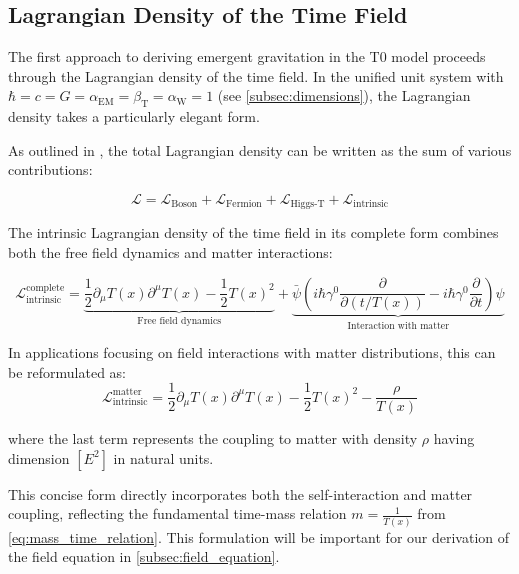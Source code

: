 \documentclass[12pt,a4paper]{article}
\newcommand{\Tfield}{T(x)}
\newcommand{\betaT}{\beta_{\text{T}}}
\newcommand{\alphaEM}{\alpha_{\text{EM}}}
\newcommand{\alphaW}{\alpha_{\text{W}}}
\begin{document}
	\subsection{Lagrangian Density of the Time Field}
	\label{subsec:lagrangian_density}
	The first approach to deriving emergent gravitation in the T0 model proceeds through the Lagrangian density of the time field. In the unified unit system with \(\hbar = c = G = \alphaEM = \betaT = \alphaW = 1\) (see \cref{subsec:dimensions}), the Lagrangian density takes a particularly elegant form.
	
	As outlined in \cite{pascher_lagrange_2025,pascher_messdifferenzen_2025}, the total Lagrangian density can be written as the sum of various contributions:
	
	\begin{equation}
		\label{eq:total_lagrangian}
		\mathcal{L} = \mathcal{L}_{\text{Boson}} + \mathcal{L}_{\text{Fermion}} + \mathcal{L}_{\text{Higgs-T}} + \mathcal{L}_{\text{intrinsic}}
	\end{equation}
	
	The intrinsic Lagrangian density of the time field in its complete form combines both the free field dynamics and matter interactions:
	
	\begin{equation}
		\label{eq:intrinsic_lagrangian_complete}
		\mathcal{L}_{\text{intrinsic}}^{\text{complete}} = \underbrace{\frac{1}{2} \partial_\mu \Tfield \partial^\mu \Tfield - \frac{1}{2}\Tfield^2}_{\text{Free field dynamics}} + \underbrace{\bar{\psi} \left( i\hbar \gamma^0 \frac{\partial}{\partial (t/\Tfield)} - i\hbar \gamma^0 \frac{\partial}{\partial t} \right) \psi}_{\text{Interaction with matter}}
	\end{equation}
	
	In applications focusing on field interactions with matter distributions, this can be reformulated as:
	\begin{equation}
		\label{eq:intrinsic_lagrangian_matter}
		\mathcal{L}_{\text{intrinsic}}^{\text{matter}} = \frac{1}{2} \partial_\mu \Tfield \partial^\mu \Tfield - \frac{1}{2}\Tfield^2 - \frac{\rho}{\Tfield}
	\end{equation}
	
	where the last term represents the coupling to matter with density $\rho$ having dimension $[E^2]$ in natural units.
	
	This concise form directly incorporates both the self-interaction and matter coupling, reflecting the fundamental time-mass relation \(m = \frac{1}{\Tfield}\) from \cref{eq:mass_time_relation}. This formulation will be important for our derivation of the field equation in \cref{subsec:field_equation}.
	
\end{document}
